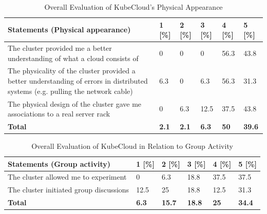 \begin{table}[H]
\centering
\begin{tabular}{|p{9cm}|p{0.8cm}|p{0.8cm}|p{0.8cm}|p{0.8cm}|p{0.8cm}|}
\hline
\rowcolor[HTML]{EFEFEF} 
\textbf{Statements (Physical appearance)}             & \textbf{1} [\%] & \textbf{2} [\%] & \textbf{3} [\%] & \textbf{4} [\%] & \textbf{5} [\%]   \\ \hline
The cluster provided me a better understanding of what a cloud consists of		 &     0 & 0 & 0 & 56.3 & 43.8 	 	\\ \hline
The physicality of the cluster provided a better understanding of errors in distributed systems (e.g. pulling the network cable)		&    6.3 & 0 & 6.3 & 56.3 & 31.3 	 	\\ \hline
The physical design of the cluster gave me associations to a real server rack		&  0 & 6.3 & 12.5 & 37.5 & 43.8   	 	\\ \hline
\rowcolor[HTML]{EFEFEF} 
\textbf{Total}             	& \textbf{2.1} & \textbf{2.1} & \textbf{6.3} & \textbf{50} & \textbf{39.6}   \\ \hline
\end{tabular}
\caption{Overall Evaluation of KubeCloud's Physical Appearance}
\label{table:overallevaluationclusterphysical}
\end{table}

\vspace{-1mm}

\begin{table}[H]
\centering
\begin{tabular}{|p{9cm}|p{0.8cm}|p{0.8cm}|p{0.8cm}|p{0.8cm}|p{0.8cm}|}
\hline
\rowcolor[HTML]{EFEFEF} 
\textbf{Statements (Group activity)}             & \textbf{1} [\%] & \textbf{2} [\%] & \textbf{3} [\%] & \textbf{4} [\%] & \textbf{5} [\%]   \\ \hline
The cluster allowed me to experiment		 & 0 & 6.3 & 18.8 & 37.5 & 37.5    	 	\\ \hline
The cluster initiated group discussions		&   12.5 & 25 & 18.8 & 12.5 & 31.3  	 	\\ \hline
\rowcolor[HTML]{EFEFEF} 
\textbf{Total}             	 & \textbf{6.3} & \textbf{15.7} & \textbf{18.8} & \textbf{25} & \textbf{34.4}   \\ \hline
\end{tabular}
\caption{Overall Evaluation of KubeCloud in Relation to Group Activity}
\label{table:overallevaluationclustergroup}
\end{table}

\vspace{-5mm}

